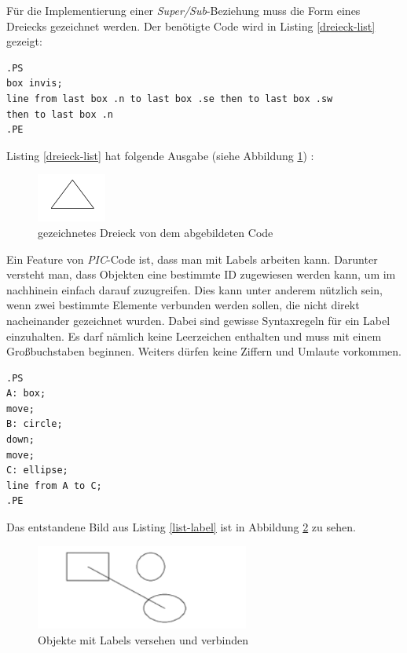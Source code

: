 \noindent
Für die Implementierung einer \textit{Super/Sub}-Beziehung muss die Form eines Dreiecks gezeichnet werden. Der benötigte Code wird in Listing \ref{dreieck-list} gezeigt:
\pra
\noindent
\lstset{frame=lines}
\lstset{basicstyle=\footnotesize}
\begin{lstlisting}
.PS
box invis;
line from last box .n to last box .se then to last box .sw
then to last box .n
.PE
\end{lstlisting}
\noindent
Listing \ref{dreieck-list} hat folgende Ausgabe (siehe Abbildung \ref{Dreieck}) :
\\

\begin{figure}[H]
	\begin{center}
		\includegraphics{images/Dreieck.png}
		\caption{gezeichnetes Dreieck von dem abgebildeten Code}
		\label{Dreieck}
	\end{center}
\end{figure}
\pra
\noindent
Ein Feature von \textit{PIC}-Code ist, dass man mit Labels arbeiten kann. Darunter versteht man, dass Objekten eine bestimmte ID zugewiesen werden kann, um im nachhinein einfach darauf zuzugreifen. Dies kann unter anderem nützlich sein, wenn zwei bestimmte Elemente verbunden werden sollen, die nicht direkt nacheinander gezeichnet wurden. Dabei sind gewisse Syntaxregeln für ein Label einzuhalten. Es darf nämlich keine Leerzeichen enthalten und muss mit einem Großbuchstaben beginnen. Weiters dürfen keine Ziffern und Umlaute vorkommen. 
\\
\pra
\noindent
\lstset{frame=lines}
\lstset{basicstyle=\footnotesize}
\begin{lstlisting}
.PS
A: box;
move;
B: circle;
down;
move;
C: ellipse;
line from A to C;
.PE
\end{lstlisting}

\noindent
Das entstandene Bild aus Listing \ref{list-label}  ist in Abbildung \ref{Label} \footnotemark[15] zu sehen.
\\

\noindent
\begin{figure}[H]
	\begin{center}
		\includegraphics[width=7cm]{images/Ergebnis_Label.png}
		\caption{Objekte mit Labels versehen und verbinden}
		\label{Label}
	\end{center}
\end{figure}

